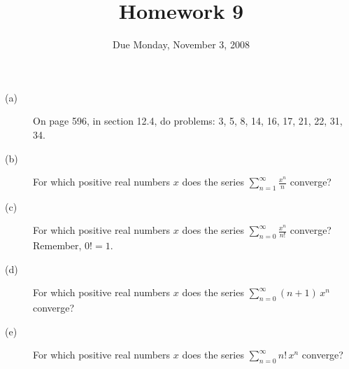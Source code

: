 \documentclass[12pt]{article}
\title{Homework 9}
\date{Due Monday, November 3, 2008}
\begin{document}
\maketitle

\begin{center}
\end{center}

\begin{description}

\item[(a)] On page 596, in section 12.4, do problems: 3, 5, 8, 14, 16, 17, 21, 22, 31, 34.

\vfill

\item[(b)] For which positive real numbers $x$ does the series
$
\displaystyle\sum_{n=1}^\infty \frac{x^n}{n}
$
converge?

\vfill

\item[(c)] For which positive real numbers $x$ does the series
$
\displaystyle\sum_{n=0}^\infty \frac{x^n}{n!}
$
converge?  Remember, $0! = 1$.

\vfill

\item[(d)] For which positive real numbers $x$ does the series
$
\displaystyle\sum_{n=0}^\infty (n+1)\, x^n
$
converge?

\vfill

\item[(e)] For which positive real numbers $x$ does the series
$
\displaystyle\sum_{n=0}^\infty n!\, x^n
$
converge?


\end{description}
\end{document}
